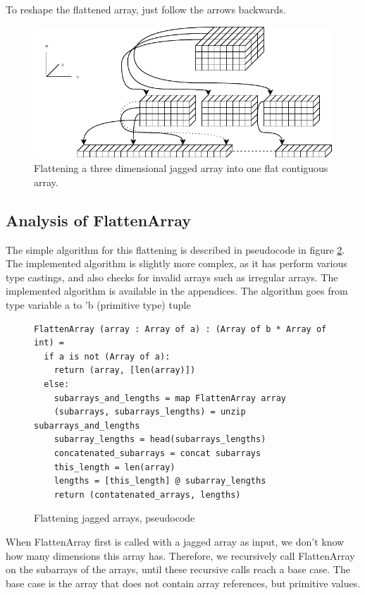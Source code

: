 To reshape the flattened array, just follow the arrows backwards.

\begin{figure}[H]
  \centering
  \includegraphics[scale=1.4, angle=270]{chapters/figs/jaggedtoflat.pdf}
  \caption{Flattening a three dimensional jagged array into one flat contiguous
    array.}
  \label{fig:jaggedtoflat}
\end{figure}



\clearpage
\subsection{Analysis of FlattenArray}
The simple algorithm for this flattening is described in pseudocode in figure
\ref{fig:flattenarray}. The implemented algorithm is slightly more complex, as
it has perform various type castings, and also checks for invalid arrays such as
irregular arrays.
The implemented algorithm is available in the appendices.
The algorithm goes from type variable a to 'b (primitive type) tuple

\begin{figure}[h]
  \centering
\begin{verbatim}
FlattenArray (array : Array of a) : (Array of b * Array of int) =
  if a is not (Array of a):
    return (array, [len(array)])
  else:
    subarrays_and_lengths = map FlattenArray array
    (subarrays, subarrays_lengths) = unzip subarrays_and_lengths
    subarray_lengths = head(subarrays_lengths)
    concatenated_subarrays = concat subarrays
    this_length = len(array)
    lengths = [this_length] @ subarray_lengths
    return (contatenated_arrays, lengths)
\end{verbatim}
  \caption{Flattening jagged arrays, pseudocode}
  \label{fig:flattenarray}
\end{figure}

When FlattenArray first is called with a jagged array as input, we don't know
how many dimensions this array has. Therefore, we recursively call FlattenArray
on the subarrays of the arrays, until these recursive calls reach a base case.
The base case is the array that does not contain array references, but primitive
values.

